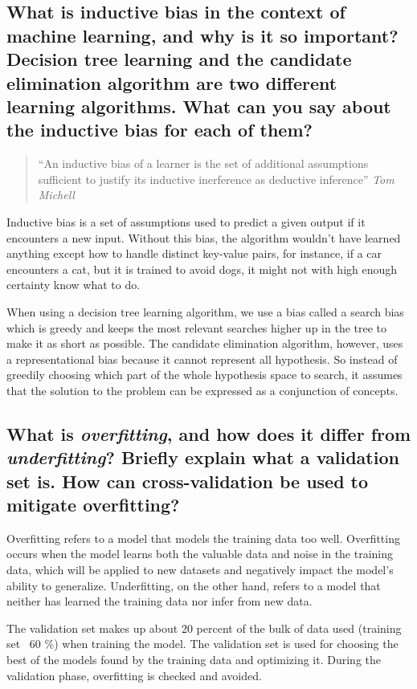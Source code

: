 \documentclass[a4paper,11pt]{article}
\theoremstyle{mytheor}
\begin{document}
\newpage
\subsection{What is inductive bias in the context of machine learning, and why is it so important? Decision tree learning and the candidate elimination algorithm are two different learning algorithms. What can you say about the inductive bias for each of them?}
\begin{quotation}
  ``An inductive bias of a learner is the set of additional assumptions sufficient to justify its inductive inerference as deductive inference''
  \em Tom Michell
\end{quotation}
Inductive bias is a set of assumptions used to predict a given output if it encounters a new input. Without this bias, the algorithm wouldn't have learned anything except how to handle distinct key-value pairs, for instance, if a car encounters a cat, but it is trained to avoid dogs, it might not with high enough certainty know what to do. 

When using a decision tree learning algorithm, we use a bias called a search bias which is greedy and keeps the most relevant searches higher up in the tree to make it as short as possible. The candidate elimination algorithm, however, uses a representational bias because it cannot represent all hypothesis. So instead of greedily choosing which part of the whole hypothesis space to search, it assumes that the solution to the problem can be expressed as a conjunction of concepts.


\subsection{What is \textit{overfitting}, and how does it differ from \textit{underfitting}? Briefly explain what a validation set is. How can cross-validation be used to mitigate overfitting?}

Overfitting refers to a model that models the training data too well. Overfitting occurs when the model learns both the valuable data and noise in the training data, which will be applied to new datasets and negatively impact the model's ability to generalize. Underfitting, on the other hand, refers to a model that neither has learned the training data nor infer from new data.

The validation set makes up about 20 percent of the bulk of data used (training set ~60 \%) when training the model. The validation set is used for choosing the best of the models found by the training data and optimizing it. During the validation phase, overfitting is checked and avoided.
\end{document}
